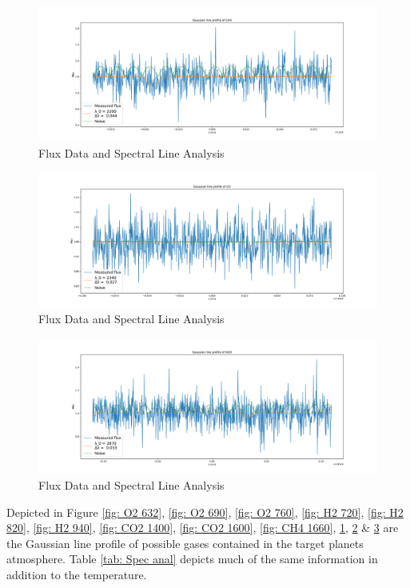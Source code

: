 \documentclass[reprint,english,notitlepage]{revtex4-2}
\begin{document}
\begin{figure}[h!]
  \centering
  \includegraphics[scale =.3]{Figures/CH4 2200.pdf}
  \caption{Flux Data and Spectral Line Analysis}
  \label{fig: CH4 2200}
\end{figure}

\begin{figure}[h!]
  \centering
  \includegraphics[scale =.3]{Figures/CO 2340.pdf}
  \caption{Flux Data and Spectral Line Analysis}
  \label{fig: CO 2340}
\end{figure}

\begin{figure}[h!]
  \centering
  \includegraphics[scale =.3]{Figures/N2O 2870.pdf}
  \caption{Flux Data and Spectral Line Analysis}
  \label{fig: N20 2870}
\end{figure}
\clearpage
\twocolumngrid

Depicted in Figure \ref{fig: O2 632}, \ref{fig: O2 690}, \ref{fig: O2 760}, \ref{fig: H2 720}, \ref{fig: H2 820}, \ref{fig: H2 940}, \ref{fig: CO2 1400}, \ref{fig: CO2 1600}, \ref{fig: CH4 1660}, \ref{fig: CH4 2200}, \ref{fig: CO 2340} \& \ref{fig: N20 2870} are the Gaussian line profile of possible gases contained in the target planets atmosphere. Table \ref{tab: Spec anal} depicts much of the same information in addition to the temperature. 
\end{document}
